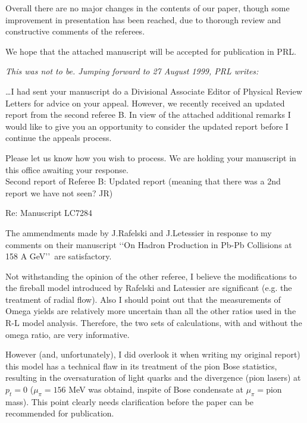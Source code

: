 \begin{mdframed}[linecolor=gray,roundcorner=12pt,backgroundcolor=Dandelion!15,linewidth=1pt,leftmargin=0cm,rightmargin=0cm,topline=true,bottomline=true,skipabove=12pt]

Overall there are no major changes in the contents of our paper, though some improvement in presentation has been reached, due to thorough review and constructive comments of the referees.

We hope that the attached manuscript will be accepted for publication in PRL.
\end{mdframed}
\vskip 0.5cm
 
\noindent \textit{This was not to be. Jumping forward to 27 August 1999, PRL writes:}\\[-0.7cm]
%
\begin{mdframed}[linecolor=gray,roundcorner=12pt,backgroundcolor=GreenYellow!15,linewidth=1pt,leftmargin=0cm,rightmargin=0cm,topline=true,bottomline=true,skipabove=12pt]\relax%
%
\ldots I had sent your manuscript do a Divisional Associate Editor of Physical Review Letters for advice on your appeal. However, we recently received an updated report from the second referee B. In view of the attached additional remarks I would like to give you an opportunity to consider the updated report before I continue the appeals process.

Please let us know how you wish to process. We are holding your manuscript in this office awaiting your response.\\

Second report of Referee B: Updated report (meaning that there was a 2nd report we have not seen? JR)

Re: Manuscript LC7284

The ammendments made by J.Rafelski and J.Letessier in response to my comments on their manuscript \lq\lq On Hadron Production in Pb-Pb Collisions at 158 A GeV\rq\rq\ are satisfactory.

Not withstanding the opinion of the other referee, I believe the modifications to the fireball model introduced by Rafelski and Latessier are significant (e.g. the treatment of radial flow). Also I should point out that the measurements of Omega yields are relatively more uncertain than all the other ratios used in the R-L model analysis. Therefore, the two sets of calculations, with and without the omega ratio, are very informative.

However (and, unfortunately), I did overlook it when writing my original report) this model has a technical flaw in its treatment of the pion Bose statistics, resulting in the oversaturation of light quarks and the divergence (pion lasers) at $p_t=0$ ($\mu_\pi=156$ MeV was obtaind, inspite of Bose condensate at $\mu_\pi=$pion mass). This point clearly needs clarification before the paper can be recommended for publication.
\end{mdframed}
